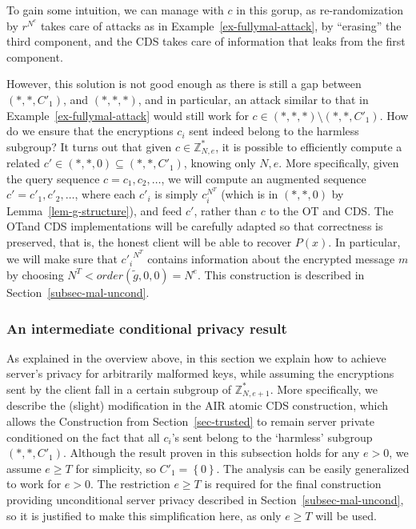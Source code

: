 \documentclass{article}
\newcommand{\set}[1]{\left\{#1\right\}}
\newcommand{\ot}{\mbox{OT}\;}
\newcommand{\U}[1]{\mathbb{Z}_{#1}^*}
\begin{document}
To gain some intuition, we can manage with $c$ in this gorup, as re-randomization by $r^{N^e}$ takes care of attacks as in Example~\ref{ex-fullymal-attack}, by ``erasing'' the third component, and the CDS takes care of
information that leaks from the first component.

However, this solution is not good enough as there is still a gap between
$(*,*,C'_1)$, and $(*,*,*)$, and
in particular, an attack similar to that in Example~\ref{ex-fullymal-attack} would still work for $c\in (*,*,*)\setminus{(*,*,C'_1)}$.
How do we ensure that the encryptions $c_i$ sent indeed belong to the harmless
subgroup? 
It turns out that given $c\in \U{N,e}$, it is possible to efficiently compute a
related $c'\in (*,*,0)\subseteq(*,*,C'_1)$, knowing only $N,e$. More
specifically, given the query sequence $c=c_1,c_2,\ldots$, we will
compute an augmented sequence $c'=c'_1,c'_2,\ldots$, where each
$c'_i$ is simply $c^{N^T}_i$ (which is in $(*,*,0)$ by
Lemma~\ref{lem-g-structure}), and feed $c'$, rather than $c$ to the \ot
and CDS. The \ot and CDS implementations will be carefully adapted so
that correctness is preserved, that is, the honest client will be
able to recover $P(x)$. In particular, we will make sure that ${c'_i}^{N^T}$ contains information about the encrypted message $m$ by choosing $N^T<order(\tilde{g},0,0)=N^e$.
This construction is described in Section~\ref{subsec-mal-uncond}.
\subsubsection{An intermediate conditional privacy result}
\label{subsec-mal-cond}
As explained in the overview above, in this section we explain how to achieve server's privacy for arbitrarily malformed keys, while assuming
the encryptions sent by the client fall in a certain subgroup of $\U{N,e+1}$. 
More specifically, we describe the (slight) modification in the AIR atomic CDS construction, which allows the
Construction from Section~\ref{sec-trusted} to remain server private conditioned on the fact that all $c_i$'s sent belong to the `harmless' subgroup $(*,*,C'_1)$.
Although the result proven in this subsection holds for
any $e>0$, we assume $e\geq T$ for simplicity, so $C'_1=\set{0}$. The analysis can be easily generalized
to work for $e>0$. The restriction $e\geq T$ is required for the final construction providing unconditional server privacy described in Section~\ref{subsec-mal-uncond},
so it is justified to make this simplification here, as only $e\geq T$ will be used.
\end{document}
